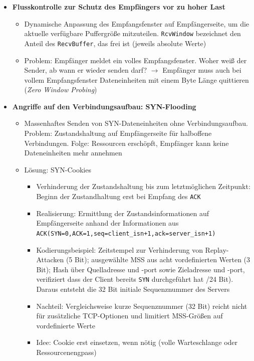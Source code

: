 \begin{itemize}
\begin{itemize}
\begin{minipage}{\linewidth}
			\end{minipage}
	\end{itemize}
	\item \textbf{Flusskontrolle zur Schutz des Empfängers vor zu hoher Last}
	\begin{itemize}
		\item Dynamische Anpassung des Empfangsfenster auf Empfängerseite, um die aktuelle verfügbare Puffergröße mitzuteilen. \texttt{RcvWindow} bezeichnet den Anteil des \texttt{RecvBuffer}, das frei ist (jeweils absolute Werte)
		\item Problem: Empfänger meldet ein volles Empfangsfenster. Woher weiß der Sender, ab wann er wieder senden darf? \(\rightarrow\) Empfänger muss auch bei vollem Empfangsfenster Dateneinheiten mit einem Byte Länge quittieren (\textit{Zero Window Probing})
	\end{itemize}
	\item \textbf{Angriffe auf den Verbindungsaufbau: SYN-Flooding}
	\begin{itemize}
		\item Massenhaftes Senden von SYN-Dateneinheiten ohne Verbindungsaufbau. Problem: Zustandshaltung auf Empfängerseite für halboffene Verbindungen. Folge: Ressourcen erschöpft, Empfänger kann keine Dateneinheiten mehr annehmen
		\item Lösung: SYN-Cookies
		\begin{itemize}
			\item Verhinderung der Zustandshaltung bis zum letztmöglichen Zeitpunkt: Beginn der Zustandhaltung erst bei Empfang des \texttt{ACK}
			\item Realisierung: Ermittlung der Zustandsinformationen auf Empfängerseite anhand der Informationen aus \texttt{ACK(SYN=0,ACK=1,seq=client\_isn+1,ack=server\_isn+1)}
			\item Kodierungsbeispiel: Zeitstempel zur Verhinderung von Replay-Attacken (5 Bit); ausgewählte MSS aus acht vordefinierten Werten (3 Bit); Hash über Quelladresse und -port sowie Zieladresse und -port, verifiziert dass der Client bereits \texttt{SYN} durchgeführt hat /24 Bit). Daraus entsteht die 32 Bit initiale Sequenznummer des Servers
			\item Nachteil: Vergleichsweise kurze Sequenznummer (32 Bit) reicht nicht für zusätzliche TCP-Optionen und limitiert MSS-Größen auf vordefinierte Werte
			\item Idee: Cookie erst einsetzen, wenn nötig (volle Warteschlange oder Ressourcenengpass)
		\end{itemize}
	\end{itemize}
\end{itemize}

